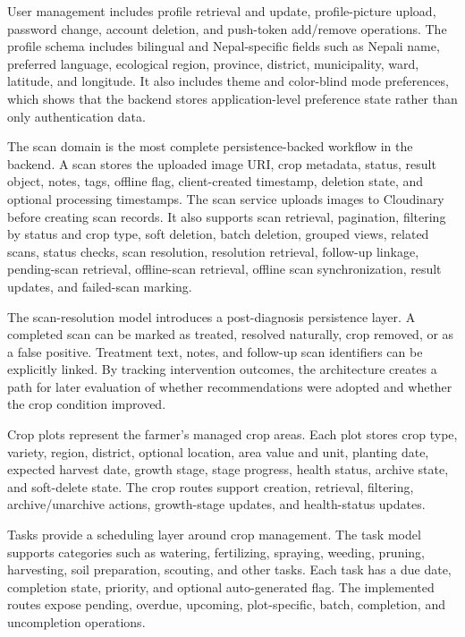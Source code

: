 User management includes profile retrieval and update, profile-picture upload, password change,
account deletion, and push-token add/remove operations. The profile schema includes bilingual and
Nepal-specific fields such as Nepali name, preferred language, ecological region, province,
district, municipality, ward, latitude, and longitude. It also includes theme and color-blind mode
preferences, which shows that the backend stores application-level preference state rather than
only authentication data.


The scan domain is the most complete persistence-backed workflow in the backend. A scan stores the
uploaded image URI, crop metadata, status, result object, notes, tags, offline flag, client-created
timestamp, deletion state, and optional processing timestamps. The scan service uploads images to
Cloudinary before creating scan records. It also supports scan retrieval, pagination, filtering by
status and crop type, soft deletion, batch deletion, grouped views, related scans, status checks,
scan resolution, resolution retrieval, follow-up linkage, pending-scan retrieval, offline-scan
retrieval, offline scan synchronization, result updates, and failed-scan marking.

The scan-resolution model introduces a post-diagnosis persistence layer. A completed scan can be
marked as treated, resolved naturally, crop removed, or as a false positive. Treatment text,
notes, and follow-up scan identifiers can be explicitly linked. By tracking intervention
outcomes, the architecture creates a path for later evaluation of whether recommendations were
adopted and whether the crop condition improved.


Crop plots represent the farmer's managed crop areas. Each plot stores crop type, variety, region,
district, optional location, area value and unit, planting date, expected harvest date, growth
stage, stage progress, health status, archive state, and soft-delete state. The crop routes support
creation, retrieval, filtering, archive/unarchive actions, growth-stage updates, and health-status
updates.

Tasks provide a scheduling layer around crop management. The task model supports categories such as
watering, fertilizing, spraying, weeding, pruning, harvesting, soil preparation, scouting, and other
tasks. Each task has a due date, completion state, priority, and optional auto-generated flag. The
implemented routes expose pending, overdue, upcoming, plot-specific, batch, completion, and
uncompletion operations.

